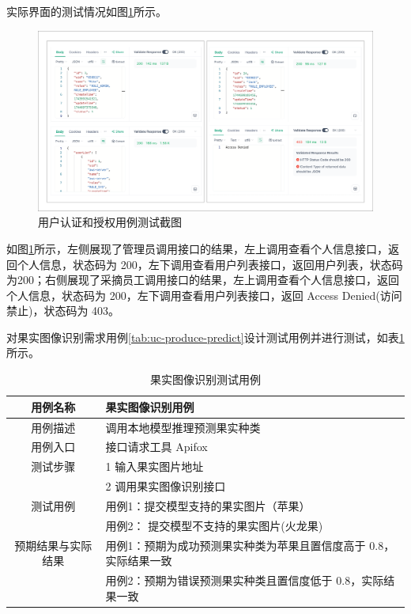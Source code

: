 实际界面的测试情况如图\ref{fig:user-auth-apifox}所示。

\begin{figure}[H]
    \centering
    \includegraphics[width=0.8\linewidth]{../result/user-auth-apifox.png}
    \caption{用户认证和授权用例测试截图}
    \label{fig:user-auth-apifox}
\end{figure}

如图\ref{fig:user-auth-apifox}所示，左侧展现了管理员调用接口的结果，左上调用查看个人信息接口，返回个人信息，状态码为 200，左下调用查看用户列表接口，返回用户列表，状态码为200；右侧展现了采摘员工调用接口的结果，左上调用查看个人信息接口，返回个人信息，状态码为 200，左下调用查看用户列表接口，返回 Access Denied(访问禁止)，状态码为 403。

对果实图像识别需求用例\ref{tab:uc-produce-predict}设计测试用例并进行测试，如表\ref{tab:uc-produce-predict-test}所示。

\begin{longtable}[ht]{|c|p{8cm}|}
\caption{果实图像识别测试用例}
\label{tab:uc-produce-predict-test}
\\
\hline
用例名称 & 果实图像识别用例 \\
\hline
用例描述 & 调用本地模型推理预测果实种类 \\
\hline
用例入口 & 接口请求工具 Apifox \\
\hline
测试步骤 & 1 输入果实图片地址 \\
& 2 调用果实图像识别接口 \\
\hline
测试用例 & 用例1：提交模型支持的果实图片（苹果） \\
& 用例2： 提交模型不支持的果实图片(火龙果) \\
\hline
预期结果与实际结果 & 用例1：预期为成功预测果实种类为苹果且置信度高于 0.8，实际结果一致 \\
& 用例2：预期为错误预测果实种类且置信度低于 0.8，实际结果一致 \\
\hline
\end{longtable}

